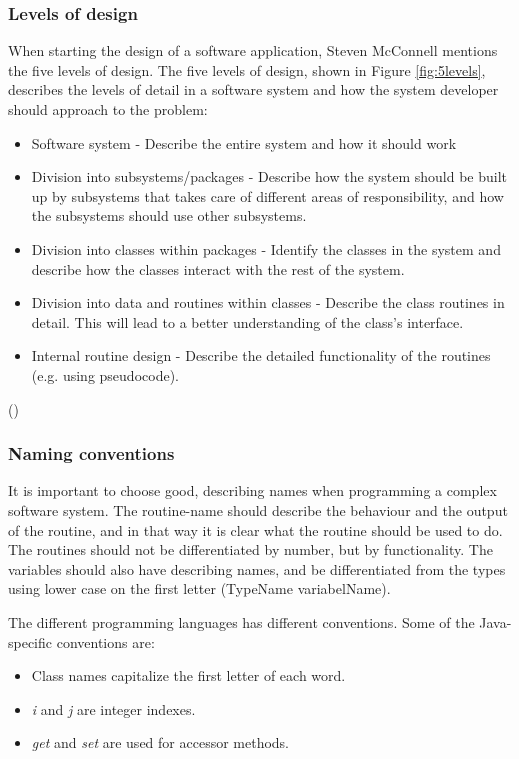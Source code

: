 \subsubsection{Levels of design}
\label{sec:levdes}
When starting the design of a software application, Steven McConnell mentions the five levels of design. The five levels of design, shown in Figure \ref{fig:5levels}, describes the levels of detail in a software system and how the system developer should approach to the problem:
\begin{itemize}
	\item Software system - Describe the entire system and how it should work
	\item Division into subsystems/packages - Describe how the system should be built up by subsystems that takes care of different areas of responsibility, and how the subsystems should use other subsystems.
	\item Division into classes within packages - Identify the classes in the system and describe how the classes interact with the rest of the system.
	\item Division into data and routines within classes - Describe the class routines in detail. This will lead to a better understanding of the class's interface.
	\item Internal routine design - Describe the detailed functionality of the routines (e.g. using pseudocode).
\end{itemize}
(\cite{stevemcconnell2004})

\subsubsection{Naming conventions}
\label{sec:nameconv}
It is important to choose good, describing names when programming a complex software system. The routine-name should describe the behaviour and the output of the routine, and in that way it is clear what the routine should be used to do. The routines should not be differentiated by number, but by functionality. The variables should also have describing names, and be differentiated from the types using lower case on the first letter (TypeName variabelName).

The different programming languages has different conventions. Some of the Java-specific conventions are:
\begin{itemize}
	\item Class names capitalize the first letter of each word.
	\item \textit{i} and \textit{j} are integer indexes.
	\item \textit{get} and \textit{set} are used for accessor methods.
\end{itemize}

